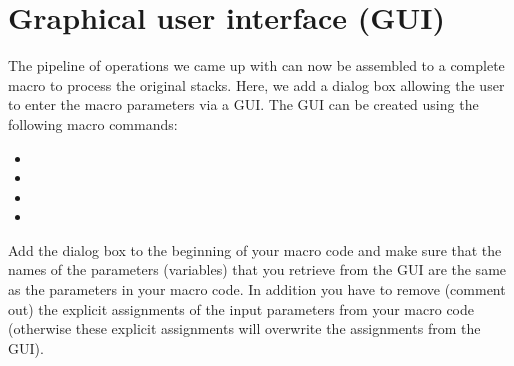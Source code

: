 \section{Graphical user interface (GUI)}
\label{sec:mod8lab1}

The pipeline of operations we came up with can now be assembled to a complete macro to process the original stacks. Here, we add a dialog box allowing the user to enter the macro parameters via a GUI. The GUI can be created using the following macro commands:

\begin{itemize}
\item {}
\item {}
\item {}
\item {}
\end{itemize}
Add the dialog box to the beginning of your macro code and make sure that the names of the parameters (variables) that you retrieve from the GUI are the same as the parameters in your macro code. In addition you have to remove (comment out) the explicit assignments of the input parameters from your macro code (otherwise these explicit assignments will overwrite the assignments from the GUI).